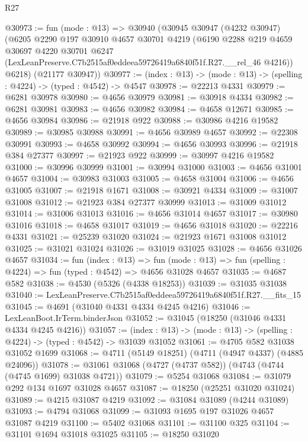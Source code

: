 \begin{lexlean}{R27}
\begin{coremodule}
@30973 := fun (mode : @13) =>
  @30940
    (@30945
      @30947
      (@4232 @30947)
      (@6205
        @2290
        @197
        @30910
        @4657
        @30701
        @4219
        (@6190
          @2288
          @219
          @4659
          @30697
          @4220
          @30701
          @6247
          (LexLeanPreserve.C7b2515af0eddeea59726419a6840f51f.R27.__rel_46 @4216))
        @6218)
      (@21177 @30947))
@30977 := (index : @13) -> (mode : @13) -> (spelling : @4224) -> (typed : @4542) -> @4547
@30978 := @22213 @4331
@30979 := @6281 @30978
@30980 := @4656 @30979
@30981 := @30918 @4334
@30982 := @6281 @30981
@30983 := @4656 @30982
@30984 := @4658 @12671
@30985 := @4656 @30984
@30986 := @21918 @922
@30988 := @30986 @4216 @19582
@30989 := @30985 @30988
@30991 := @4656 @30989 @4657
@30992 := @22308 @30991
@30993 := @4658 @30992
@30994 := @4656 @30993
@30996 := @21918 @384 @27377
@30997 := @21923 @922
@30999 := @30997 @4216 @19582
@31000 := @30996 @30999
@31001 := @30994 @31000
@31003 := @4656 @31001 @4657
@31004 := @30983 @31003
@31005 := @4658 @31004
@31006 := @4656 @31005
@31007 := @21918 @1671
@31008 := @30921 @4334
@31009 := @31007 @31008
@31012 := @21923 @384 @27377 @30999
@31013 := @31009 @31012
@31014 := @31006 @31013
@31016 := @4656 @31014 @4657
@31017 := @30980 @31016
@31018 := @4658 @31017
@31019 := @4656 @31018
@31020 := @22216 @4331
@31021 := @25239 @31020
@31024 := @21923 @1671 @31008 @31012
@31025 := @31021 @31024
@31026 := @31019 @31025
@31028 := @4656 @31026 @4657
@31034 := fun (index : @13) =>
  fun (mode : @13) => fun (spelling : @4224) => fun (typed : @4542) => @4656 @31028 @4657
@31035 := @4687 @582
@31038 := @4530 (@5326 (@4338 @18253))
@31039 := @31035 @31038
@31040 := LexLeanPreserve.C7b2515af0eddeea59726419a6840f51f.R27.__fits_15
@31045 := @4691 (@31040 @4331 @4334 @4245 @4216)
@31046 := LexLeanBoot.IrTerm.binderJson
@31052 := @31045 (@18250 (@31046 @4331 @4334 @4245 @4216))
@31057 := (index : @13) -> (mode : @13) -> (spelling : @4224) -> (typed : @4542) -> @31039 @31052
@31061 := @4705 @582 @31038 @31052 @1699
@31068 := @4711 (@5149 @18251) (@4711 (@4947 @4337) (@4885 @24096))
@31078 := @31061 @31068 (@4727 (@4737 @582)) (@4743 (@4744 (@4745 @1699) @31038 @4721))
@31079 := @5254 @31068
@31084 := @31079 @292 @134 @1697 @31028 @4657
@31087 := @18250 (@25251 @31020 @31024)
@31089 := @4215 @31087 @4219
@31092 := @31084 @31089 (@4244 @31089)
@31093 := @4794 @31068
@31099 := @31093 @1695 @197 @31026 @4657 @31087 @4219
@31100 := @5402 @31068
@31101 := @31100 @325
@31104 := @31101 @1694 @31018 @31025
@31105 := @18250 @31020

\end{coremodule}
\end{lexlean}
